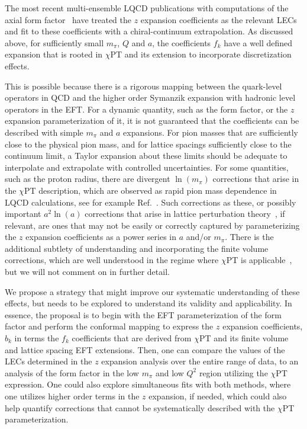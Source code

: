 \documentclass{ar-1col}
\begin{document}
The most recent multi-ensemble LQCD publications with computations
of the axial form factor~\cite{Park:2021ypf,RQCD:2019jai}
have treated the $z$ expansion coefficients as the relevant LECs
and fit to these coefficients with a chiral-continuum extrapolation.
As discussed above, for sufficiently small $m_\pi$, $Q$ and $a$, the coefficients $f_k$ have a well defined expansion that is rooted in $\chi$PT and its extension to incorporate discretization effects.%
\begin{marginnote}
\end{marginnote}%
This is possible because there is a rigorous mapping between the quark-level operators in QCD and the higher order Symanzik expansion with hadronic level operators in the EFT.
For a dynamic quantity, such as the form factor, or the $z$ expansion parameterization of it, it is not guaranteed that the coefficients can be described with simple $m_\pi$ and $a$ expansions.  For pion masses that are sufficiently close to the physical pion mass, and for lattice spacings sufficiently close to the continuum limit, a Taylor expansion about these limits should be adequate to interpolate and extrapolate with controlled uncertainties.
For some quantities, such as the proton radius, there are divergent $\ln(m_\pi)$ corrections that arise in the $\chi$PT description, which are observed as rapid pion mass dependence in LQCD calculations, see for example Ref.~\cite{Green:2014xba}.  Such corrections as these, or possibly important $a^2\ln(a)$ corrections that arise in lattice perturbation theory~\cite{Balog:2009yj,Balog:2009np,Husung:2019ytz}, if relevant, are ones that may not be easily or correctly captured by parameterizing the $z$ expansion coefficients as a power series in $a$ and/or $m_\pi$.
There is the additional subtlety of understanding and incorporating the finite volume corrections, which are well understood in the regime where $\chi$PT is applicable~\cite{Gasser:1986vb}, but we will not comment on in further detail.

We propose a strategy that might improve our systematic understanding of these effects, but needs to be explored to understand its validity and applicability.
In essence, the proposal is to begin with the EFT parameterization of the form factor and perform the conformal mapping to express the $z$ expansion coefficients, $b_k$ in terms the $f_k$ coefficients that are derived from $\chi$PT and its finite volume and lattice spacing EFT extensions.
Then, one can compare the values of the LECs determined in the $z$ expansion analysis over the entire range of data, to an analysis of the form factor in the low $m_\pi$ and low $Q^2$ region utilizing the $\chi$PT expression.  One could also explore simultaneous fits with both methods, where one utilizes higher order terms in the $z$ expansion, if needed, which could also help quantify corrections that cannot be systematically described with the $\chi$PT parameterization.
\end{document}
